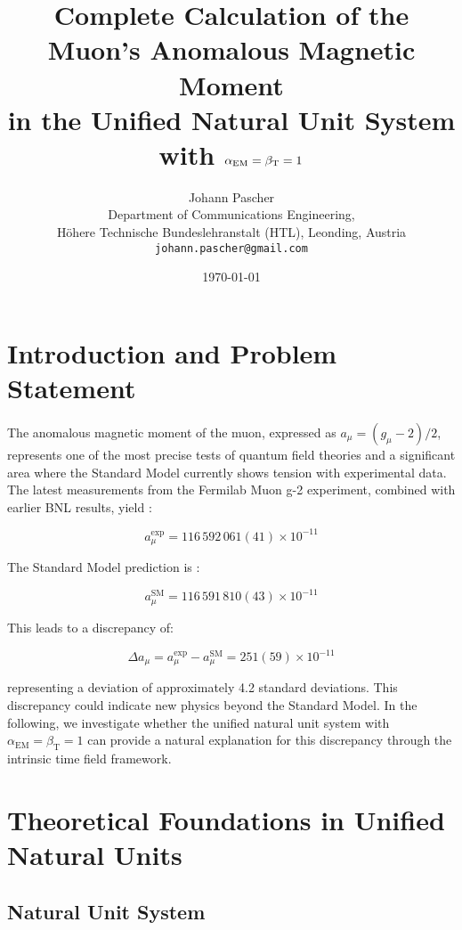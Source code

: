 \documentclass[12pt,a4paper]{article}
\title{Complete Calculation of the Muon's Anomalous Magnetic Moment \\
	in the Unified Natural Unit System with $\alphaEM = \betaT = 1$}
\author{Johann Pascher\\
	Department of Communications Engineering, \\Höhere Technische Bundeslehranstalt (HTL), Leonding, Austria\\
	\texttt{johann.pascher@gmail.com}}
\date{\today}
\newcommand{\alphaEM}{\alpha_{\text{EM}}}
\newcommand{\betaT}{\beta_{\text{T}}}
\begin{document}
	
	\maketitle
	
	\tableofcontents
	\newpage
	
	\section{Introduction and Problem Statement}
	
	The anomalous magnetic moment of the muon, expressed as $a_\mu = (g_\mu-2)/2$, represents one of the most precise tests of quantum field theories and a significant area where the Standard Model currently shows tension with experimental data. The latest measurements from the Fermilab Muon g-2 experiment, combined with earlier BNL results, yield \cite{Muong-2:2021ojo}:
	
	\begin{equation}
		a_\mu^{\text{exp}} = 116\,592\,061(41) \times 10^{-11}
	\end{equation}
	
	The Standard Model prediction is \cite{Aoyama2020}:
	
	\begin{equation}
		a_\mu^{\text{SM}} = 116\,591\,810(43) \times 10^{-11}
	\end{equation}
	
	This leads to a discrepancy of:
	
	\begin{equation}
		\Delta a_\mu = a_\mu^{\text{exp}} - a_\mu^{\text{SM}} = 251(59) \times 10^{-11}
	\end{equation}
	
	representing a deviation of approximately 4.2 standard deviations. This discrepancy could indicate new physics beyond the Standard Model. In the following, we investigate whether the unified natural unit system with $\alphaEM = \betaT = 1$ can provide a natural explanation for this discrepancy through the intrinsic time field framework.
	
	\section{Theoretical Foundations in Unified Natural Units}
	
	\subsection{Natural Unit System}
	\label{subsec:natural_unit_system}
	
\end{document}
